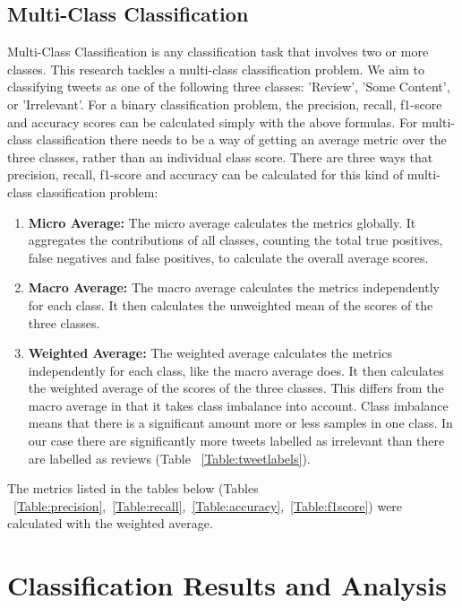 \subsection{Multi-Class Classification}
Multi-Class Classification is any classification task that involves two or more classes. This research tackles a multi-class classification problem. We aim to classifying tweets as one of the following three classes: 'Review', 'Some Content', or 'Irrelevant'. For a binary classification problem, the precision, recall, f1-score and accuracy scores can be calculated simply with the above formulas. For multi-class classification there needs to be a way of getting an average metric over the three classes, rather than an individual class score.
There are three ways that precision, recall, f1-score and accuracy can be calculated for this kind of multi-class classification problem:
\begin{enumerate}
    \item \textbf{Micro Average:}\newline
    The micro average calculates the metrics globally. It aggregates the contributions of all classes, counting the total true positives, false negatives and false positives, to calculate the overall average scores.  
    \item \textbf{Macro Average:}\newline
    The macro average calculates the metrics independently for each class. It then calculates the unweighted mean of the scores of the three classes.
    \item \textbf{Weighted Average:}\newline
    The weighted average calculates the metrics independently for each class, like the macro average does. It then calculates the weighted average of the scores of the three classes. This differs from the macro average in that it takes class imbalance into account. Class imbalance means that there is a significant amount more or less samples in one class. In our case there are significantly more tweets labelled as irrelevant than there are labelled as reviews (Table ~\ref{Table:tweetlabels}).
\end{enumerate}

The metrics listed in the tables below (Tables ~\ref{Table:precision},~\ref{Table:recall},~\ref{Table:accuracy},~\ref{Table:f1score}) were calculated with the weighted average.

\section{Classification Results and Analysis}

